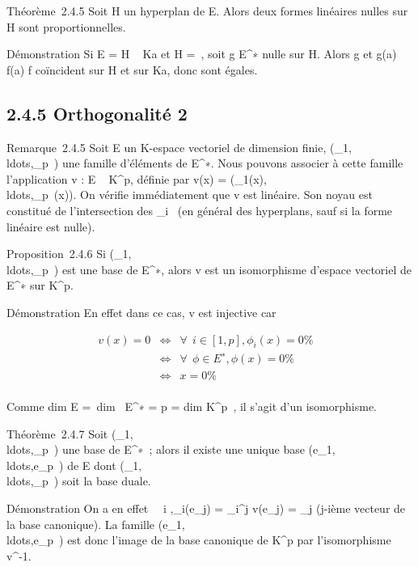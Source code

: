 \documentclass[]{article}
\begin{document}
Théorème~2.4.5 Soit H un hyperplan de E. Alors deux formes linéaires
nulles sur H sont proportionnelles.

Démonstration Si E = H \oplus~ Ka et H =\
\mathrmKerf, soit g \in E^∗ nulle sur H.
Alors g et  g(a) \over f(a) f coïncident sur H et sur
Ka, donc sont égales.

\subsection{2.4.5 Orthogonalité 2}

Remarque~2.4.5 Soit E un K-espace vectoriel de dimension finie,
(\phi_1,\\ldots,\phi_p~)
une famille d'éléments de E^∗. Nous pouvons associer à cette
famille l'application v : E \rightarrow~ K^p, définie par v(x) =
(\phi_1(x),\\ldots,\phi_p~(x)).
On vérifie immédiatement que v est linéaire. Son noyau est constitué de
l'intersection des
\mathrmKer\phi_i~ (en
général des hyperplans, sauf si la forme linéaire est nulle).

Proposition~2.4.6 Si
(\phi_1,\\ldots,\phi_p~)
est une base de E^∗, alors v est un isomorphisme d'espace
vectoriel de E^∗ sur K^p.

Démonstration En effet dans ce cas, v est injective car

\begin{align*} v(x) = 0&
\Leftrightarrow & \forall~~i \in
[1,p], \phi_i(x) = 0\%& \\ &
\Leftrightarrow & \forall~~\phi \in
E^∗, \phi(x) = 0 \%& \\ &
\Leftrightarrow & x = 0 \%&
\\ \end{align*}

Comme dim E =\ dim~
E^∗ = p = dim K^p~, il
s'agit d'un isomorphisme.

Théorème~2.4.7 Soit
(\phi_1,\\ldots,\phi_p~)
une base de E^∗~; alors il existe une unique base
(e_1,\\ldots,e_p~)
de E dont
(\phi_1,\\ldots,\phi_p~)
soit la base duale.

Démonstration On a en effet \forall~~i \in
[1,p],\phi_i(e_j) = \delta_i^j
\Leftrightarrow v(e_j) = \epsilon_j (j-ième
vecteur de la base canonique). La famille
(e_1,\\ldots,e_p~)
est donc l'image de la base canonique de K^p par
l'isomorphisme v^-1.
\end{document}
